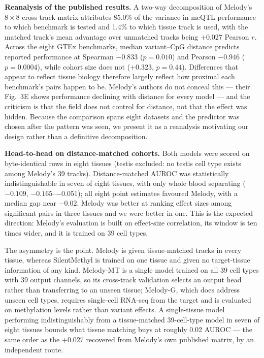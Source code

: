 \documentclass[10pt,letterpaper,twocolumn]{article}
\begin{document}
\textbf{Reanalysis of the published results.} A two-way decomposition of
Melody's $8\times8$ cross-track matrix attributes 85.0\% of the variance in
meQTL performance to which benchmark is tested and 1.4\% to which tissue track
is used, with the matched track's mean advantage over unmatched tracks being
$+0.027$ Pearson $r$. Across the eight GTEx benchmarks, median variant--CpG
distance predicts reported performance at Spearman $-0.833$ ($p=0.010$) and
Pearson $-0.946$ ($p=0.0004$), while cohort size does not ($+0.323$, $p=0.44$).
Differences that appear to reflect tissue biology therefore largely reflect how
proximal each benchmark's pairs happen to be. Melody's authors do not conceal
this --- their Fig.~3E shows performance declining with distance for every model
--- and the criticism is that the field does not control for distance, not that
the effect was hidden. Because the comparison spans eight datasets and the
predictor was chosen after the pattern was seen, we present it as a reanalysis
motivating our design rather than a definitive decomposition.

\textbf{Head-to-head on distance-matched cohorts.} Both models were scored on
byte-identical rows in eight tissues (testis excluded: no testis cell type
exists among Melody's 39 tracks). Distance-matched AUROC was statistically
indistinguishable in seven of eight tissues, with only whole blood separating
($-0.109$, $-0.165$--$-0.051$); all eight point estimates favoured Melody, with
a median gap near $-0.02$. Melody was better at ranking effect sizes among
significant pairs in three tissues and we were better in one. This is the
expected direction: Melody's evaluation is built on effect-size correlation, its
window is ten times wider, and it is trained on 39 cell types.

The asymmetry is the point. Melody is given tissue-matched tracks in every
tissue, whereas SilentMethyl is trained on one tissue and given no target-tissue
information of any kind. Melody-MT is a single model trained on all 39 cell
types with 39 output channels, so its cross-track validation selects an output
head rather than transferring to an unseen tissue; Melody-G, which does address
unseen cell types, requires single-cell RNA-seq from the target and is evaluated
on methylation levels rather than variant effects. A single-tissue model
performing indistinguishably from a tissue-matched 39-cell-type model in seven
of eight tissues bounds what tissue matching buys at roughly 0.02 AUROC --- the
same order as the $+0.027$ recovered from Melody's own published matrix, by an
independent route.
\end{document}
